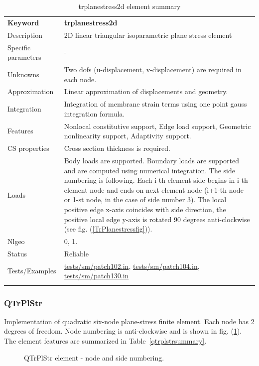 \documentclass[a4paper]{article}
\newcommand{\templabel}{}%
\newcommand{\tempcaption}{}%
\newcounter{nelpar}
\newenvironment{elementsummary}[5]{%
  \gdef\tempcaption{#4}%
  \gdef\templabel{#5}%
  \setcounter{nelpar}{0}%
  \begin{center} %
    \begin{table}[!htb] %
      \begin{tabular}{|l|p{9cm}|}\hline %
        {\bf Keyword} & \bf{#1}\\ %
        {Description} & {#2}\\ %
        {Specific parameters} & {#3}\\ \hline %
}{
  \\ \hline %
      \end{tabular}%
      \caption{\tempcaption}%
      \label{\templabel}%
    \end{table}%
  \end{center}%
}
\newcommand{\elementDescription}[2]{{#1} & {#2}\\}
\begin{document}
\begin{elementsummary}{trplanestress2d}{2D linear triangular isoparametric plane stress element}{-}{trplanestress2d element summary}{trplanestress2dsummary}
\elementDescription{Unknowns}{Two dofs (u-displacement, v-displacement) are required in each node.}
\elementDescription{Approximation}{Linear approximation of displacements and geometry.}
\elementDescription{Integration}{Integration of membrane strain terms using one point gauss integration formula.}
\elementDescription{Features}{Nonlocal constitutive support, Edge load support, Geometric nonlinearity support, Adaptivity support.}
\elementDescription{CS properties}{Cross section thickness is required.}
\elementDescription{Loads}{Body loads are supported. Boundary loads are
supported and are computed  using numerical integration. The side numbering is
following. Each i-th element side begins in i-th element node and
ends on next element node (i+1-th node or 1-st node, in the case of 
side number 3). The local positive edge x-axis coincides with side
direction, the positive local edge y-axis is rotated 90 degrees
anti-clockwise (see fig. (\ref{TrPlanestressfig})).}
\elementDescription{Nlgeo}{0, 1.}
\elementDescription{Status}{Reliable}
\elementDescription{Tests/Examples}{\href{https://github.com/oofem/oofem/blob/devel/tests/sm/patch102.in}{tests/sm/patch102.in}, \href{https://github.com/oofem/oofem/blob/devel/tests/sm/patch104.in}{tests/sm/patch104.in}, \href{https://github.com/oofem/oofem/blob/devel/tests/sm/patch130.in}{tests/sm/patch130.in}}
\end{elementsummary}



\subsubsection{QTrPlStr}
Implementation of quadratic six-node plane-stress finite
element. Each node has 2 degrees of freedom. Node numbering is
anti-clockwise and is shown in fig. (\ref{qtrplanstressfig}). The element features are summarized in Table~\ref{qtrplstrsummary}.

\begin{figure}[htb]
 \centering
 \begin{makeimage}
  
 \end{makeimage}
 \caption{QTrPlStr element - node and side numbering.}
 \label{qtrplanstressfig}
\end{figure}
\end{document}
